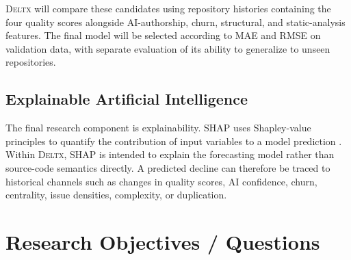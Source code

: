 \documentclass[12pt,a4paper,oneside]{report}
\newcommand{\systemname}{\textsc{Deltx}}
\begin{document}
\systemname{} will compare these candidates using repository histories containing the four quality scores alongside AI-authorship, churn, structural, and static-analysis features. The final model will be selected according to MAE and RMSE on validation data, with separate evaluation of its ability to generalize to unseen repositories.

\section{Explainable Artificial Intelligence}
The final research component is explainability. SHAP uses Shapley-value principles to quantify the contribution of input variables to a model prediction \citep{perspective_on_xai_methods_shap_and_lime}. Within \systemname{}, SHAP is intended to explain the forecasting model rather than source-code semantics directly. A predicted decline can therefore be traced to historical channels such as changes in quality scores, AI confidence, churn, centrality, issue densities, complexity, or duplication.

\chapter{Research Objectives / Questions}
\label{ch:objectives}
\end{document}
